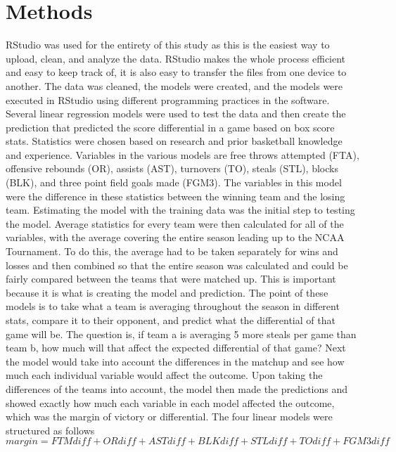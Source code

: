 \documentclass{article}
\begin{document}
\section{Methods}
RStudio was used for the entirety of this study as this is the easiest way to upload, clean, and analyze the data. RStudio makes the whole process efficient and easy to keep track of, it is also easy to transfer the files from one device to another. The data was cleaned, the models were created, and the models were executed in RStudio using different programming practices in the software. 
\newline \indent Several linear regression models were used to test the data and then create the prediction that predicted the score differential in a game based on box score stats. Statistics were chosen based on research and prior basketball knowledge and experience. Variables in the various models are free throws attempted (FTA), offensive rebounds (OR), assists (AST), turnovers (TO), steals (STL), blocks (BLK), and three point field goals made (FGM3). The variables in this model were the difference in these statistics between the winning team and the losing team. Estimating the model with the training data was the initial step to testing the model. 
\newline \indent Average statistics for every team were then calculated for all of the variables, with the average covering the entire season leading up to the NCAA Tournament. To do this, the average had to be taken separately for wins and losses and then combined so that the entire season was calculated and could be fairly compared between the teams that were matched up. This is important because it is what is creating the model and prediction. The point of these models is to take what a team is averaging throughout the season in different stats, compare it to their opponent, and predict what the differential of that game will be. The question is, if team a is averaging 5 more steals per game than team b, how much will that affect the expected differential of that game? 
\newline \indent Next the model would take into account the differences in the matchup and see how much each individual variable would affect the outcome. Upon taking the differences of the teams into account, the model then made the predictions and showed exactly how much each variable in each model affected the outcome, which was the margin of victory or differential. The four linear models were structured as follows \begin{equation}
    margin = FTMdiff + ORdiff + ASTdiff + BLKdiff + STLdiff + TOdiff + FGM3diff
\end{equation}
\end{document}
